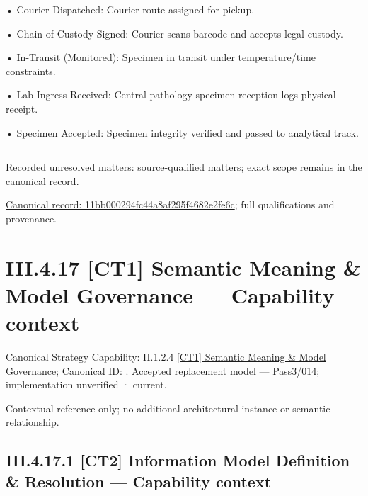 •
Courier Dispatched: Courier route assigned for pickup.



•
Chain-of-Custody Signed: Courier scans barcode and accepts legal custody.



•
In-Transit (Monitored): Specimen in transit under temperature/time constraints.



•
Lab Ingress Received: Central pathology specimen reception logs physical receipt.



•
Specimen Accepted: Specimen integrity verified and passed to analytical track.



\medskip\hrule\medskip

{\small Recorded unresolved matters: source-qualified matters; exact scope remains in the canonical record.}\par
{\footnotesize \href{../../../../../../../continuum/business/business-process/11bb000294fc44a8af295f4682e2fe6c.md}{Canonical record: 11bb000294fc44a8af295f4682e2fe6c}; full qualifications and provenance.}\par
\section*{III.4.17 [CT1] Semantic Meaning \& Model Governance — Capability context}
\label{navigation:III.4.17}

{\small Canonical Strategy Capability: II.1.2.4 \hyperref[element:cc25d325f7104ccda137cbf6ee371fb3]{[CT1] Semantic Meaning \& Model Governance}; Canonical ID: \texttt{}. Accepted replacement model — Pass3/014; implementation unverified · current.}\par
Contextual reference only; no additional architectural instance or semantic relationship.\par
\subsection*{III.4.17.1 [CT2] Information Model Definition \& Resolution — Capability context}
\label{navigation:III.4.17.1}

